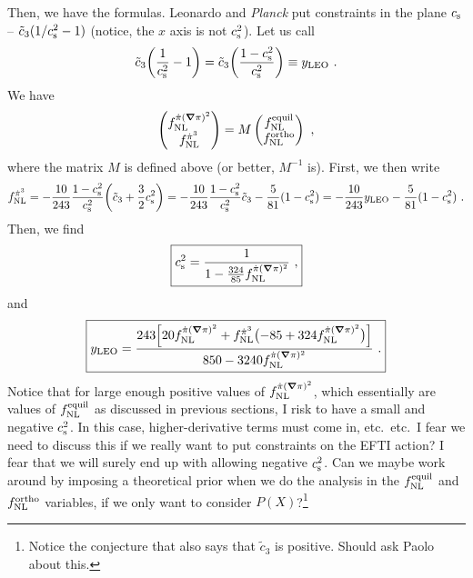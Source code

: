 \documentclass[aps,prd,amsmath,floats,floatfix,superscriptaddress,nofootinbib%
]{revtex4}%
\renewcommand\({\left(}
\renewcommand\){\right)}
\renewcommand\[{\left[}
\renewcommand\]{\right]}
\renewcommand{\vec}{\bm}
\begin{document}
Then, we have the formulas. Leonardo and \emph{Planck} put constraints in the plane $c_{\rm s}$ -- $\tilde{c}_3(1/c^2_{\rm s}-1)$ (notice, the $x$ axis is not $c^2_{\rm s}$). 
Let us call 
\begin{equation}
\tilde{c}_3\bigg(\frac{1}{c^2_{\rm s}}-1\bigg) = \tilde{c}_3\bigg(\frac{1-c^2_{\rm s}}{c^2_{\rm s}}\bigg) \equiv y_{\rm LEO}\,\,. 
\end{equation} 
We have 
\begin{equation}
\begin{pmatrix}
f_{\rm NL}^{\dot{\pi}(\vec{\nabla}\pi)^2} \\
f_{\rm NL}^{\dot{\pi}^3}
\end{pmatrix} 
= M
\begin{pmatrix}
f_{\rm NL}^{\rm equil} \\
f_{\rm NL}^{\rm ortho}
\end{pmatrix}
\,\,, 
\end{equation} 
where the matrix $M$ is defined above (or better, $M^{-1}$ is). First, we then write 
\begin{equation}
f_{\rm NL}^{\dot{\pi}^3} = 
{-\frac{10}{243}}\frac{1-c^2_{\rm s}}{c^2_{\rm s}}\bigg(\tilde{c}_3+\frac{3}{2}c^2_{\rm s}\bigg) = 
{-\frac{10}{243}}\frac{1-c^2_{\rm s}}{c^2_{\rm s}}\tilde{c}_3 - {\frac{5}{81}}({1-c^2_{\rm s}})
= {-\frac{10}{243}}y_{\rm LEO} - {\frac{5}{81}}({1-c^2_{\rm s}})\,\,. 
\end{equation} 
Then, we find 
\begin{equation}
\boxed{c^2_{\rm s} = \frac{1}{1-\frac{324}{85}f_{\rm NL}^{\dot{\pi}(\vec{\nabla}\pi)^2}}\,\,,}
\end{equation}
and 
\begin{equation}
\boxed{y_{\rm LEO} = \frac{243\Big[20f_{\rm NL}^{\dot{\pi}(\vec{\nabla}\pi)^2}+f_{\rm NL}^{\dot{\pi}^3}\big({-85} + 324f_{\rm NL}^{\dot{\pi}(\vec{\nabla}\pi)^2}\big)\Big]}{850 - 3240f_{\rm NL}^{\dot{\pi}(\vec{\nabla}\pi)^2}}\,\,.}
\end{equation} 
Notice that for large enough positive values of $f_{\rm NL}^{\dot{\pi}(\vec{\nabla}\pi)^2}$, which essentially are values of $f_{\rm NL}^{\rm equil}$ 
as discussed in previous sections, I risk to have a small and negative $c^2_{\rm s}$. In this case, higher-derivative terms must come in, etc.~etc.~I fear we need 
to discuss this if we really want to put constraints on the EFTI action? I fear that we will surely end up with allowing negative $c^2_{\rm s}$. 
Can we maybe work around by imposing a theoretical prior when we do the analysis in the $f_{\rm NL}^{\rm equil}$ and $f_{\rm NL}^{\rm ortho}$ variables, if we only want to consider $P(X)$?\footnote{Notice the conjecture that also says that $\tilde{c}_3$ is positive. Should ask Paolo about this.} 
\end{document}
